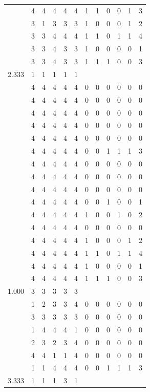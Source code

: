 \documentclass[]{msu-thesis}
\theoremstyle{definition}
\theoremstyle{definition}
\theoremstyle{definition}
\theoremstyle{remark}
\begin{document}
\begin{table}
{\begin{tabular}[t]{rrrrrrrrrrrr}
 & 4 & 4 & 4 & 4 & 4 & 1 & 1 & 0 & 0 & 1 & 3\\
 & 3 & 1 & 3 & 3 & 3 & 1 & 0 & 0 & 0 & 1 & 2\\
 & 3 & 3 & 4 & 4 & 4 & 1 & 1 & 0 & 1 & 1 & 4\\
 & 3 & 3 & 4 & 3 & 3 & 1 & 0 & 0 & 0 & 0 & 1\\
 & 3 & 3 & 4 & 3 & 3 & 1 & 1 & 1 & 0 & 0 & 3\\
2.333 & 1 & 1 & 1 & 1 & 1 &  &  &  &  &  & \\
 & 4 & 4 & 4 & 4 & 4 & 0 & 0 & 0 & 0 & 0 & 0\\
 & 4 & 4 & 4 & 4 & 4 & 0 & 0 & 0 & 0 & 0 & 0\\
 & 4 & 4 & 4 & 4 & 4 & 0 & 0 & 0 & 0 & 0 & 0\\
 & 4 & 4 & 4 & 4 & 4 & 0 & 0 & 0 & 0 & 0 & 0\\
 & 4 & 4 & 4 & 4 & 4 & 0 & 0 & 0 & 0 & 0 & 0\\
 & 4 & 4 & 4 & 4 & 4 & 0 & 0 & 1 & 1 & 1 & 3\\
 & 4 & 4 & 4 & 4 & 4 & 0 & 0 & 0 & 0 & 0 & 0\\
 & 4 & 4 & 4 & 4 & 4 & 0 & 0 & 0 & 0 & 0 & 0\\
 & 4 & 4 & 4 & 4 & 4 & 0 & 0 & 0 & 0 & 0 & 0\\
 & 4 & 4 & 4 & 4 & 4 & 0 & 0 & 1 & 0 & 0 & 1\\
 & 4 & 4 & 4 & 4 & 4 & 1 & 0 & 0 & 1 & 0 & 2\\
 & 4 & 4 & 4 & 4 & 4 & 0 & 0 & 0 & 0 & 0 & 0\\
 & 4 & 4 & 4 & 4 & 4 & 1 & 0 & 0 & 0 & 1 & 2\\
 & 4 & 4 & 4 & 4 & 4 & 1 & 1 & 0 & 1 & 1 & 4\\
 & 4 & 4 & 4 & 4 & 4 & 1 & 0 & 0 & 0 & 0 & 1\\
 & 4 & 4 & 4 & 4 & 4 & 1 & 1 & 1 & 0 & 0 & 3\\
1.000 & 3 & 3 & 3 & 3 & 3 &  &  &  &  &  & \\
 & 1 & 2 & 3 & 3 & 4 & 0 & 0 & 0 & 0 & 0 & 0\\
 & 3 & 3 & 3 & 3 & 3 & 0 & 0 & 0 & 0 & 0 & 0\\
 & 1 & 4 & 4 & 4 & 1 & 0 & 0 & 0 & 0 & 0 & 0\\
 & 2 & 3 & 2 & 3 & 4 & 0 & 0 & 0 & 0 & 0 & 0\\
 & 4 & 4 & 1 & 1 & 4 & 0 & 0 & 0 & 0 & 0 & 0\\
 & 1 & 1 & 4 & 4 & 4 & 0 & 0 & 1 & 1 & 1 & 3\\
3.333 & 1 & 1 & 1 & 3 & 1 &  &  &  &  &  & \\

\end{tabular}}
\end{table}
\end{document}
